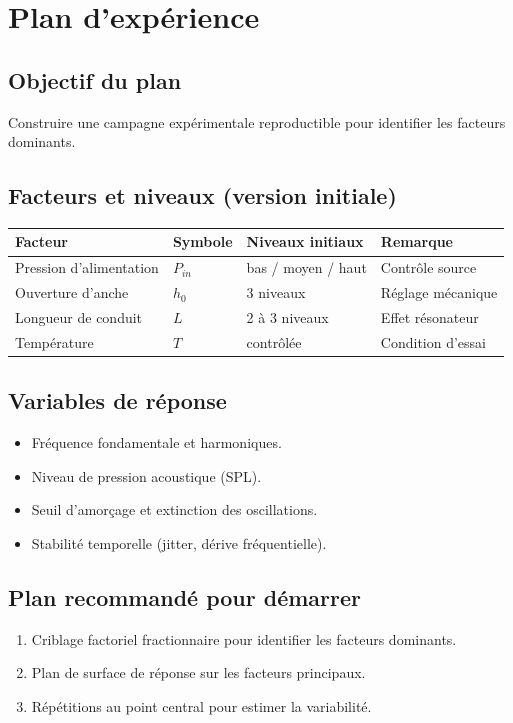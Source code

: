 \chapter{Plan d’expérience}

\section{Objectif du plan}
Construire une campagne expérimentale reproductible pour identifier les facteurs dominants.

\section{Facteurs et niveaux (version initiale)}
\begin{longtable}{@{}llll@{}}
\toprule
Facteur & Symbole & Niveaux initiaux & Remarque \\
\midrule
\endhead
Pression d’alimentation & $P_{in}$ & bas / moyen / haut & Contrôle source \\
Ouverture d’anche & $h_0$ & 3 niveaux & Réglage mécanique \\
Longueur de conduit & $L$ & 2 à 3 niveaux & Effet résonateur \\
Température & $T$ & contrôlée & Condition d’essai \\
\bottomrule
\end{longtable}

\section{Variables de réponse}
\begin{itemize}
  \item Fréquence fondamentale et harmoniques.
  \item Niveau de pression acoustique (SPL).
  \item Seuil d’amorçage et extinction des oscillations.
  \item Stabilité temporelle (jitter, dérive fréquentielle).
\end{itemize}

\section{Plan recommandé pour démarrer}
\begin{enumerate}
  \item Criblage factoriel fractionnaire pour identifier les facteurs dominants.
  \item Plan de surface de réponse sur les facteurs principaux.
  \item Répétitions au point central pour estimer la variabilité.
\end{enumerate}
